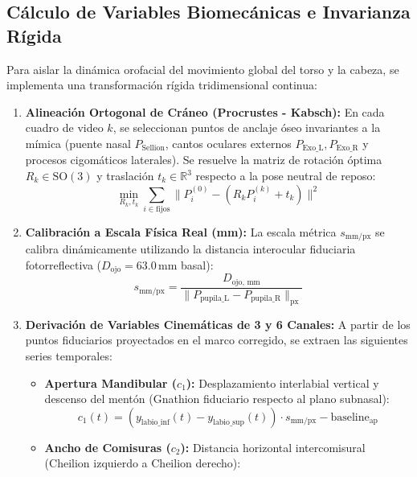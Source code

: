 \documentclass[11pt,a4paper]{report}
\begin{document}
\subsection{Cálculo de Variables Biomecánicas e Invarianza Rígida}
Para aislar la dinámica orofacial del movimiento global del torso y la cabeza, se implementa una transformación rígida tridimensional continua:
\begin{enumerate}
    \item \textbf{Alineación Ortogonal de Cráneo (Procrustes - Kabsch):} En cada cuadro de video $k$, se seleccionan puntos de anclaje óseo invariantes a la mímica (puente nasal $P_{\text{Sellion}}$, cantos oculares externos $P_{\text{Exo\_L}}, P_{\text{Exo\_R}}$ y procesos cigomáticos laterales). Se resuelve la matriz de rotación óptima $R_k \in \mathrm{SO}(3)$ y traslación $t_k \in \mathbb{R}^3$ respecto a la pose neutral de reposo:
    \begin{equation}
        \min_{R_k, t_k} \sum_{i \in \text{fijos}} \| P_i^{(0)} - (R_k P_i^{(k)} + t_k) \|^2
    \end{equation}
    \item \textbf{Calibración a Escala Física Real (mm):} La escala métrica $s_{\text{mm/px}}$ se calibra dinámicamente utilizando la distancia interocular fiduciaria fotorreflectiva ($D_{\text{ojo}} = 63.0\,\text{mm}$ basal):
    \begin{equation}
        s_{\text{mm/px}} = \frac{D_{\text{ojo, mm}}}{\| P_{\text{pupila\_L}} - P_{\text{pupila\_R}} \|_{\text{px}}}
    \end{equation}
    \item \textbf{Derivación de Variables Cinemáticas de 3 y 6 Canales:}
    A partir de los puntos fiduciarios proyectados en el marco corregido, se extraen las siguientes series temporales:
    \begin{itemize}
        \item \textbf{Apertura Mandibular ($c_1$):} Desplazamiento interlabial vertical y descenso del mentón (Gnathion fiduciario respecto al plano subnasal):
        \begin{equation}
            c_1(t) = (y_{\text{labio\_inf}}(t) - y_{\text{labio\_sup}}(t)) \cdot s_{\text{mm/px}} - \text{baseline}_{\text{ap}}
        \end{equation}
        \item \textbf{Ancho de Comisuras ($c_2$):} Distancia horizontal intercomisural (Cheilion izquierdo a Cheilion derecho):
        \begin{equation}

\end{equation}
\end{itemize}
\end{enumerate}
\end{document}
